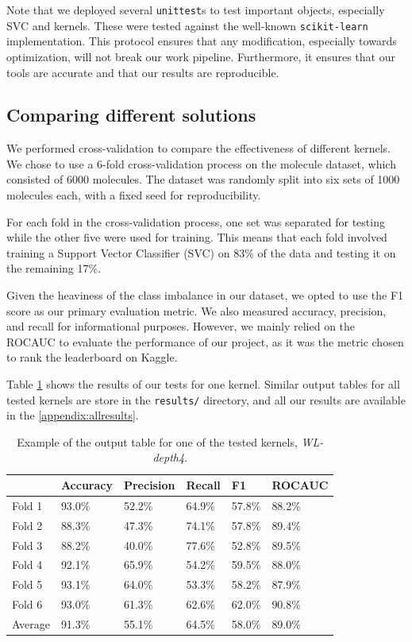 \documentclass{IEEEtran}
\begin{document}
Note that we deployed several \texttt{unittest}s to test important objects, especially SVC and kernels. These were tested against the well-known \texttt{scikit-learn} implementation. This protocol ensures that any modification, especially towards optimization, will not break our work pipeline. Furthermore, it ensures that our tools are accurate and that our results are reproducible.

\subsection{Comparing different solutions}
We performed cross-validation to compare the effectiveness of different kernels. We chose to use a 6-fold cross-validation process on the molecule dataset, which consisted of 6000 molecules. The dataset was randomly split into six sets of 1000 molecules each, with a fixed seed for reproducibility.

For each fold in the cross-validation process, one set was separated for testing while the other five were used for training. This means that each fold involved training a Support Vector Classifier (SVC) on 83\% of the data and testing it on the remaining 17\%.

Given the heaviness of the class imbalance in our dataset, we opted to use the F1 score as our primary evaluation metric. We also measured accuracy, precision, and recall for informational purposes. However, we mainly relied on the ROCAUC to evaluate the performance of our project, as it was the metric chosen to rank the leaderboard on Kaggle.

Table \ref{tab:example} shows the results of our tests for one kernel.
Similar output tables for all tested kernels are store in the \texttt{results/} directory,
and all our results are available in the \ref{appendix:allresults}.

\begin{table}[h]
    \centering
    \begin{tabular}{l||llll|l}
                & Accuracy & Precision & Recall & F1     & ROCAUC \\
        \hline \hline
        Fold 1  & 93.0\%   & 52.2\%    & 64.9\% & 57.8\% & 88.2\% \\
        Fold 2  & 88.3\%   & 47.3\%    & 74.1\% & 57.8\% & 89.4\% \\
        Fold 3  & 88.2\%   & 40.0\%    & 77.6\% & 52.8\% & 89.5\% \\
        Fold 4  & 92.1\%   & 65.9\%    & 54.2\% & 59.5\% & 88.0\% \\
        Fold 5  & 93.1\%   & 64.0\%    & 53.3\% & 58.2\% & 87.9\% \\
        Fold 6  & 93.0\%   & 61.3\%    & 62.6\% & 62.0\% & 90.8\% \\
        \hline
        Average & 91.3\%   & 55.1\%    & 64.5\% & 58.0\% & 89.0\% \\
    \end{tabular}
    \caption{Example of the output table for one of the tested kernels, \emph{WL-depth4}.}
    \label{tab:example}
\end{table}
\end{document}
